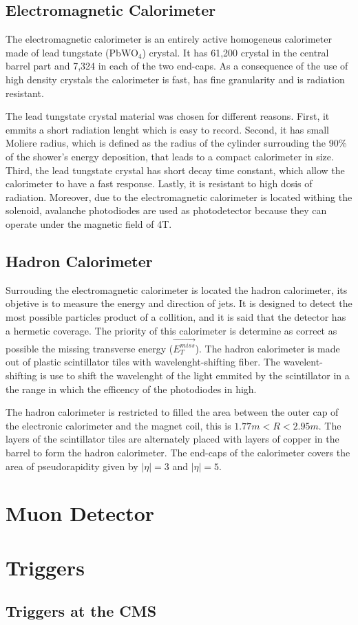 \subsection{Electromagnetic Calorimeter}

The electromagnetic calorimeter is an entirely active homogeneus calorimeter made of lead tungstate (PbWO$_4$) crystal. It has 61,200 crystal in the central barrel part and 7,324  in each of the two end-caps. As a consequence of the use of high density crystals the calorimeter is fast, has fine granularity and is radiation resistant. 

The lead tungstate crystal material was chosen for different reasons. First, it emmits a short radiation lenght which is easy to record. Second, it has small Moliere radius, which is defined as the radius of the cylinder surrouding the 90\% of the shower's energy deposition, that leads to a compact calorimeter in size. Third, the lead tungstate crystal has short decay time constant, which allow the calorimeter to have a fast response. Lastly, it is resistant to high dosis of radiation. Moreover, due to the electromagnetic calorimeter is located withing the solenoid, avalanche photodiodes are used as photodetector because they can operate under the magnetic field of 4T. 

\subsection{Hadron Calorimeter}

Surrouding the electromagnetic calorimeter is located the hadron calorimeter, its objetive is to measure the energy and direction of jets. It is designed to detect the most possible particles product of a collition, and it is said that the detector has a hermetic coverage. The priority of this calorimeter is determine as correct as possible the missing transverse energy ($\vec{E_T^{miss}}$). The hadron calorimeter is made out of plastic scintillator tiles with wavelenght-shifting fiber. The wavelent-shifting is use to shift the wavelenght of the light emmited by the scintillator in a the range in which the efficency of the photodiodes in high.

The hadron calorimeter is restricted to filled the area between the outer cap of the electronic calorimeter and the magnet coil, this is $1.77 m < R < 2.95m$. The layers of the scintillator tiles are alternately placed with layers of copper in the barrel to form the hadron calorimeter. The end-caps of the calorimeter covers the area of pseudorapidity given by $|\eta|= 3$ and $|\eta|= 5$.


\section{Muon Detector}

\section{Triggers}


\subsection{Triggers at the CMS}






